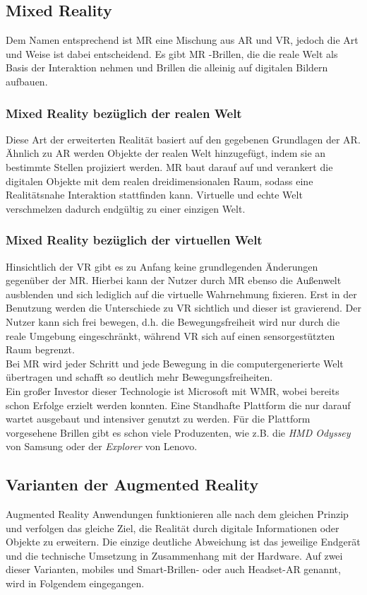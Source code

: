 \subsection*{Mixed Reality}
Dem Namen entsprechend ist \ac{MR} eine Mischung aus \acl{AR} und \acl{VR}, jedoch die Art und Weise ist dabei entscheidend. Es gibt \acs{MR}
-Brillen, die die reale Welt als Basis der Interaktion nehmen und Brillen die alleinig auf digitalen Bildern aufbauen. \cite{mr.2018o}
\subsubsection*{Mixed Reality bezüglich der realen Welt}
Diese Art der erweiterten Realität basiert auf den gegebenen Grundlagen der \acs{AR}. Ähnlich zu \acl{AR} werden Objekte der realen Welt 
hinzugefügt, indem sie an bestimmte Stellen projiziert werden. \acl{MR} baut darauf auf und verankert die digitalen Objekte mit dem realen
dreidimensionalen Raum, sodass eine Realitätsnahe Interaktion stattfinden kann. Virtuelle und echte Welt verschmelzen dadurch endgültig zu 
einer einzigen Welt. 

\subsubsection*{Mixed Reality bezüglich der virtuellen Welt}
Hinsichtlich der \acs{VR} gibt es zu Anfang keine grundlegenden Änderungen gegenüber der \acs{MR}. Hierbei kann der Nutzer durch 
\acs{MR} ebenso die Außenwelt ausblenden und sich lediglich auf die virtuelle Wahrnehmung fixieren. Erst in der Benutzung werden die Unterschiede 
zu \acs{VR} sichtlich und dieser ist gravierend. Der Nutzer kann sich frei bewegen, d.h. die Bewegungsfreiheit wird nur durch die reale Umgebung 
eingeschränkt, während \acl{VR} sich auf einen sensorgestützten Raum begrenzt. \cite{vr.2018n}
\\ 
Bei \acs{MR} wird jeder Schritt und jede Bewegung in die computergenerierte Welt übertragen und schafft so deutlich mehr Bewegungsfreiheiten.
\\ 
\linebreak 
Ein großer Investor dieser Technologie ist Microsoft mit \ac{WMR}, wobei bereits schon Erfolge erzielt werden konnten. Eine Standhafte Plattform 
die nur darauf wartet ausgebaut und intensiver genutzt zu werden. Für die Plattform vorgesehene Brillen gibt es schon viele Produzenten, wie z.B. 
die \textit{HMD Odyssey} von Samsung oder der \textit{Explorer} von Lenovo.

\subsection{Varianten der Augmented Reality}
\label{subchap:Varianten der AR}
Augmented Reality Anwendungen funktionieren alle nach dem gleichen Prinzip und verfolgen das gleiche Ziel, die Realität durch digitale Informationen 
oder Objekte zu erweitern. Die einzige deutliche Abweichung ist das jeweilige Endgerät und die technische Umsetzung in Zusammenhang mit der 
Hardware. Auf zwei dieser Varianten, mobiles und Smart-Brillen- oder auch Headset-AR genannt, wird in Folgendem eingegangen.

